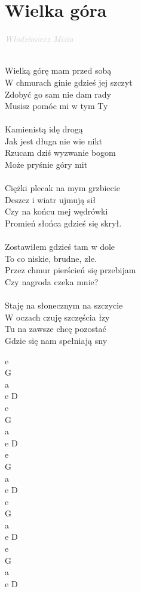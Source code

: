 \documentclass[a5paper, 10pt]{book}
\begin{document}
\section{Wielka góra}\textcolor{lightgray}{\textit{Włodzimierz Mizia\\}}~\\
\begin{minipage}[t]{0.7\textwidth}
Wielką górę mam przed sobą 			\\
W chmurach ginie gdzieś jej szczyt 		\\
Zdobyć go sam nie dam rady 			\\
Musisz pomóc mi w tym Ty 			\\
\\
Kamienistą idę drogą 					\\
Jak jest długa nie wie nikt 					\\
Rzucam dziś wyzwanie bogom\\
 Może pryśnie góry mit \\
\\
Ciężki plecak na mym grzbiecie\\
 Deszcz i wiatr ujmują sił \\
Czy na końcu mej wędrówki \\
Promień słońca gdzieś się skrył. \\
\\
Zostawiłem gdzieś tam w dole \\
To co niskie, brudne, złe. \\
Przez chmur pierścień się przebijam \\
Czy nagroda czeka mnie? \\
\\
Staję na słonecznym na szczycie\\
 W oczach czuję szczęścia łzy \\
Tu na zawsze chcę pozostać\\
 Gdzie się nam spełniają sny\\
\end{minipage}
\begin{minipage}[t]{0.3\textwidth}
e\\
G\\
a\\
e D\\

e\\
G\\
a\\
e D\\

e\\
G\\
a\\
e D\\

e\\
G\\
a\\
e D\\

e\\
G\\
a\\
e D\\


\end{minipage}
\end{document}
